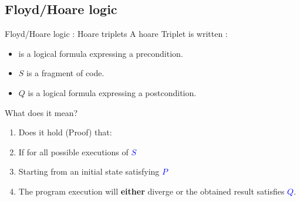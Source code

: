 \subsection{Floyd/Hoare logic}

\begin{frame}{Floyd/Hoare logic : Hoare triplets}
A hoare Triplet is written :
\begin{itemize}
	\item  \color{blue}{$P$}  \color{black}is a logical formula expressing a precondition.
	\item \color{blue}$S$ \color{black}is a fragment of code.
	\item \color{blue}$Q$ \color{black}is a logical formula expressing a postcondition.
\end{itemize} 
\color{black}What does it mean?
\pause
\begin{enumerate}
	\item Does it hold (Proof) that:
	\item If for all possible executions of \textcolor{blue}{$S$}
	\item Starting from an initial state satisfying \textcolor{blue}{$P$}
	\item The program execution will 
\textbf{either} diverge or the obtained result satisfies \textcolor{blue}{$Q$}.
\end{enumerate}
\end{frame}

